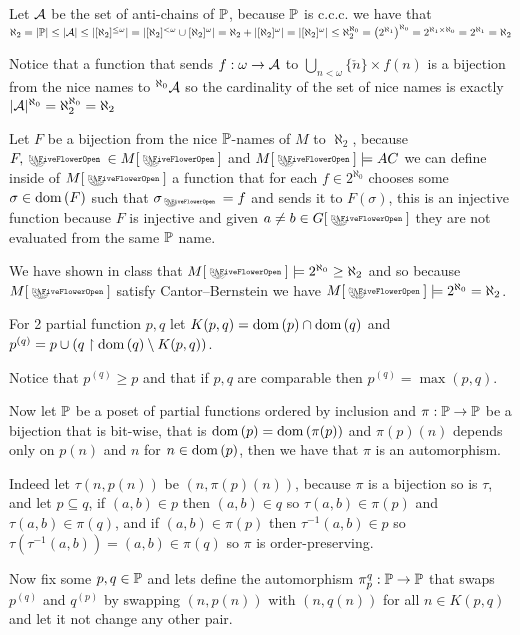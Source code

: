 Let $\cal A$ be the set of anti-chains of $\P$, because $\P$ is c.c.c. we have that $\aleph_2=|\P|\le|\cal A|\le |[\aleph_2]^{\le \omega}|=|[\aleph_2]^{< \omega}\cup [\aleph_2]^{\omega}|=\aleph_2+|[\aleph_2]^{\omega}|=|[\aleph_2]^{\omega}|\le \aleph_2^{\aleph_0}=\left(2^{\aleph_1}\right)^{\aleph_0}=2^{\aleph_1\times\aleph_0}=2^{\aleph_1}=\aleph_2$

Notice that a function that sends $f:\omega\to\cal A$ to $\bigcup_{n<\omega}\{\check{n}\}\times f(n)$ is a bijection from the nice names to $^{\aleph_0}\cal A$ so the cardinality of the set of nice names is exactly $|\cal A|^{\aleph_0}=\aleph_2^{\aleph_0}=\aleph_2$

\sub{}

Let $F$ be a bijection from the nice $\P$-names of $M$ to $\aleph_2$, because $F,\flower\in M[\flower]$ and $M[\flower]\models AC$ we can define inside of $M[\flower]$ a function that for each $f\in 2^{\aleph_0}$ chooses some $\sigma\in\dom{F}$ such that $\sigma_\flower=f$ and sends it to $F(\sigma)$, this is an injective function because $F$ is injective and given $a\ne b\in G[\flower]$ they are not evaluated from the same $\P$ name.
	
We have shown in class that $M[\flower]\models 2^{\aleph_0}\ge\aleph_2$ and so because $M[\flower]$ satisfy Cantor–Bernstein we have $M[\flower]\models 2^{\aleph_0}=\aleph_2$.

{}
\sub{}
For 2 partial function $p,q$ let $K(p,q)=\dom{p}\cap \dom{q}$ and $p^{(q)}=p\cup (q\restriction \dom{q}\setminus K(p,q))$.

Notice that $p^{(q)}\ge p$ and that if $p,q$ are comparable then $p^{(q)}=\max(p,q)$.

Now let $\P$ be a poset of partial functions ordered by inclusion and $\pi:\P\to\P$ be a bijection that is bit-wise, that is $\dom{p}=\dom{\pi(p)}$ and $\pi(p)(n)$ depends only on $p(n)$ and $n$ for $n\in\dom{p}$, then we have that $\pi$ is an automorphism.

Indeed let $\tau(n,p(n))$ be $(n,\pi(p)(n))$, because $\pi$ is a bijection so is $\tau$, and let $p\subseteq q$, if $(a,b)\in p$ then $(a,b)\in q$ so $\tau(a,b)\in \pi(p)$ and $\tau(a,b)\in \pi(q)$, and if $(a,b)\in \pi(p)$ then $\tau^{-1}(a,b)\in p$ so $\tau(\tau^{-1}(a,b))=(a,b)\in \pi(q)$ so $\pi$ is order-preserving.

Now fix some $p,q\in\P$ and lets define the automorphism $\pi_p^q:\P\to\P$ that swaps $p^{(q)}$ and $q^{(p)}$ by swapping $(n,p(n))$ with $(n,q(n))$ for all $n\in K(p,q)$ and let it not change any other pair.


